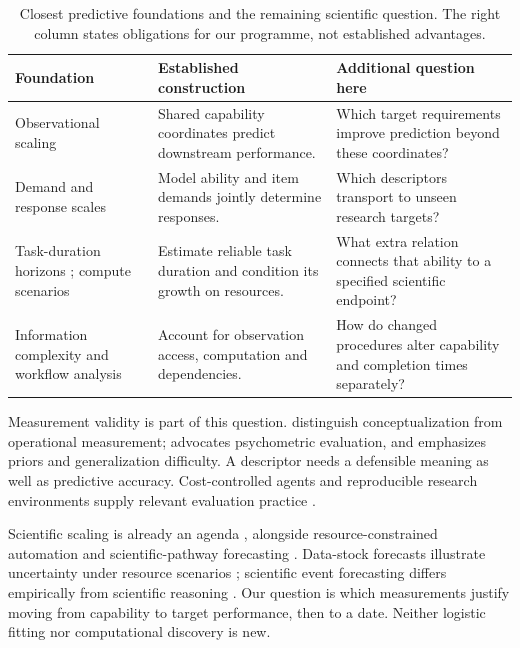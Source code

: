 \begin{table}[htbp]
\centering\small
\caption{Closest predictive foundations and the remaining scientific question. The right column states obligations for our programme, not established advantages.}
\label{tab:foundations}
\begin{tabular}{P{.26\linewidth}P{.31\linewidth}P{.34\linewidth}}
\toprule
Foundation & Established construction & Additional question here\\
\midrule
Observational scaling \citep{ruan2024} & Shared capability coordinates predict downstream performance. & Which target requirements improve prediction beyond these coordinates?\\\addlinespace[3pt]
Demand and response scales \citep{zhou2026scales,truong2026irsl} & Model ability and item demands jointly determine responses. & Which descriptors transport to unseen research targets?\\\addlinespace[3pt]
Task-duration horizons \citep{kwa2025}; compute scenarios \citep{whitfill2025} & Estimate reliable task duration and condition its growth on resources. & What extra relation connects that ability to a specified scientific endpoint?\\\addlinespace[3pt]
Information complexity and workflow analysis \citep{werschulz2002,meyerson2025} & Account for observation access, computation and dependencies. & How do changed procedures alter capability and completion times separately?\\
\bottomrule
\end{tabular}
\end{table}

Measurement validity is part of this question. \citet{wallach2025} distinguish conceptualization from operational measurement; \citet{zhuang2025} advocates psychometric evaluation, and \citet{chollet2019} emphasizes priors and generalization difficulty. A descriptor needs a defensible meaning as well as predictive accuracy. Cost-controlled agents and reproducible research environments supply relevant evaluation practice \citep{kapoor2024,bragg2026astabench}.

Scientific scaling is already an agenda \citep{zhang2025discovery,ye2026v2}, alongside resource-constrained automation and scientific-pathway forecasting \citep{luo2026,chamoun2026}. Data-stock forecasts illustrate uncertainty under resource scenarios \citep{villalobos2024}; scientific event forecasting differs empirically from scientific reasoning \citep{wu2026forecasting}. Our question is which measurements justify moving from capability to target performance, then to a date. Neither logistic fitting nor computational discovery is new.



